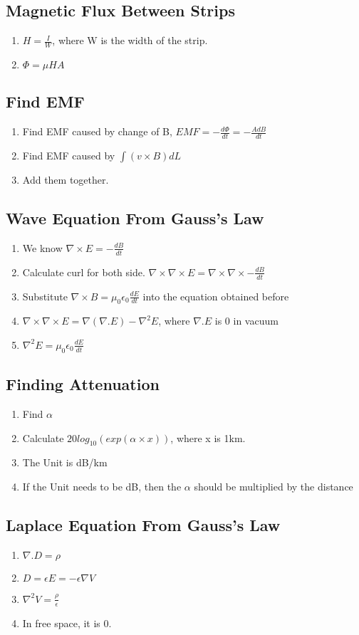\documentclass{article}
\begin{document}
   \subsection{Magnetic Flux Between Strips}
   \begin{enumerate}
   \item    $ H = \frac{I}{W} $, where W is the width of the strip.
   \item  $\Phi = \mu HA$
   \end{enumerate}
   
   \subsection{Find EMF}
   \begin{enumerate}
   \item Find EMF caused by change of B, $EMF = -\frac{d\Phi}{dt} = -\frac{A dB}{dt}$
   \item Find EMF caused by $\int (v\times B)dL$
   \item Add them together.
   \end{enumerate}

   \subsection{Wave Equation From Gauss's Law}
   
   \begin{enumerate}
     \item We know $\nabla\times E= -\frac{dB}{dt}$
     \item Calculate curl for both side. $\nabla \times \nabla \times E = \nabla \times \nabla \times -\frac{dB}{dt}$
     \item Substitute $\nabla \times B = \mu_0\epsilon_0\frac{dE}{dt}$ into the equation obtained before
     \item $\nabla \times \nabla \times E  = \nabla (\nabla .E) - \nabla^2E$, where $\nabla .E$ is 0 in vacuum
     \item $\nabla^2E = \mu_0\epsilon_0\frac{dE}{dt}$
   \end{enumerate}
   
   \subsection{Finding Attenuation}
   \begin{enumerate}
     \item Find $\alpha$
     \item Calculate $20log_{10}(exp(\alpha\times x))$, where x is 1km.
     \item The Unit is dB/km
     \item If the Unit needs to be dB, then the $\alpha$ should be multiplied by the distance
   \end{enumerate}

   \subsection{Laplace Equation From Gauss's Law}
   \begin{enumerate}
      \item $\nabla .D = \rho$
      \item $D = \epsilon E = - \epsilon\nabla V$
      \item $\nabla^2 V = \frac{\rho}{\epsilon}$
      \item In free space, it is 0.
   \end{enumerate}
   
  
\end{document}
